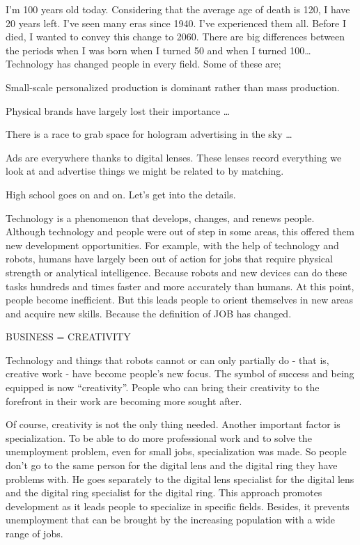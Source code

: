 \documentclass[]{book}
\begin{document}
I'm 100 years old today. Considering that the average age of death is 120, I have 20 years left. I've seen many eras since 1940. I've experienced them all. Before I died, I wanted to convey this change to 2060. There are big differences between the periods when I was born when I turned 50 and when I turned 100\ldots{} Technology has changed people in every field. Some of these are;

Small-scale personalized production is dominant rather than mass production.

Physical brands have largely lost their importance \ldots{}

There is a race to grab space for hologram advertising in the sky \ldots{}

Ads are everywhere thanks to digital lenses. These lenses record everything we look at and advertise things we might be related to by matching.

High school goes on and on. Let's get into the details.

Technology is a phenomenon that develops, changes, and renews people. Although technology and people were out of step in some areas, this offered them new development opportunities. For example, with the help of technology and robots, humans have largely been out of action for jobs that require physical strength or analytical intelligence. Because robots and new devices can do these tasks hundreds and times faster and more accurately than humans. At this point, people become inefficient. But this leads people to orient themselves in new areas and acquire new skills. Because the definition of JOB has changed.

BUSINESS = CREATIVITY

Technology and things that robots cannot or can only partially do - that is, creative work - have become people's new focus. The symbol of success and being equipped is now ``creativity''. People who can bring their creativity to the forefront in their work are becoming more sought after.

Of course, creativity is not the only thing needed. Another important factor is specialization. To be able to do more professional work and to solve the unemployment problem, even for small jobs, specialization was made. So people don't go to the same person for the digital lens and the digital ring they have problems with. He goes separately to the digital lens specialist for the digital lens and the digital ring specialist for the digital ring. This approach promotes development as it leads people to specialize in specific fields. Besides, it prevents unemployment that can be brought by the increasing population with a wide range of jobs.
\end{document}
